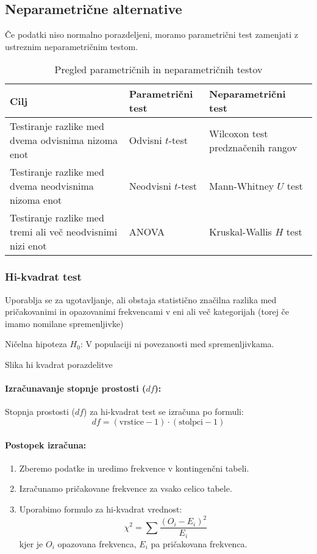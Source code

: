 \subsection*{Neparametrične alternative}

Če podatki niso normalno porazdeljeni, moramo parametrični test zamenjati z ustreznim neparametričnim testom.

\begin{table}[h!]
    \centering
    \begin{tabular}{|l|l|l|}
    \hline
    \textbf{Cilj} & \textbf{Parametrični test} & \textbf{Neparametrični test} \\ \hline
    Testiranje razlike med dvema odvisnima nizoma enot & Odvisni $t$-test & Wilcoxon test predznačenih rangov \\ \hline
    Testiranje razlike med dvema neodvisnima nizoma enot & Neodvisni $t$-test & Mann-Whitney $U$ test \\ \hline
    Testiranje razlike med tremi ali več neodvisnimi nizi enot & ANOVA & Kruskal-Wallis $H$ test \\ \hline
    \end{tabular}
    \caption{Pregled parametričnih in neparametričnih testov}
\end{table}

\subsubsection*{Hi-kvadrat test}

Uporablja se za ugotavljanje, ali obstaja statistično značilna razlika med pričakovanimi in opazovanimi frekvencami v eni ali več kategorijah (torej če imamo nomilane spremenljivke)

Ničelna hipoteza $H_0$: V populaciji ni povezanosti med spremenljivkama.

Slika hi kvadrat porazdelitve

\paragraph{Izračunavanje stopnje prostosti ($df$):}
Stopnja prostosti ($df$) za hi-kvadrat test se izračuna po formuli:
\[df = (\text{vrstice} - 1) \cdot (\text{stolpci} - 1)\]

\paragraph{Postopek izračuna:}
\begin{enumerate}
    \item Zberemo podatke in uredimo frekvence v kontingenčni tabeli.
    \item Izračunamo pričakovane frekvence za vsako celico tabele.
    \item Uporabimo formulo za hi-kvadrat vrednost:
    \[\chi^2 = \sum \frac{(O_i - E_i)^2}{E_i}\]
    kjer je $O_i$ opazovana frekvenca, $E_i$ pa pričakovana frekvenca.
\end{enumerate}

